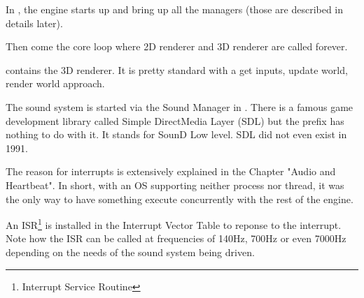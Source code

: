 \documentclass[book.tex]{subfiles}
\begin{document}
\par
In , the engine starts up and bring up all the managers (those are described in details later).\\
\par
\begin{minipage}{\textwidth}

\end{minipage}
\par
Then come the core loop where 2D renderer and 3D renderer are called forever.\\
\par
\begin{minipage}{\textwidth}

\end{minipage}
\par
{} contains the 3D renderer. It is pretty standard with a get inputs, update world, render world approach.\\
\par
\begin{minipage}{\textwidth}

\end{minipage}
\par
The sound system is started via the Sound Manager in . There is a famous game development library called Simple DirectMedia Layer (SDL) but the prefix  has nothing to do with it. It stands for SounD Low level. SDL did not even exist in 1991.\\
\par
The reason for interrupts is extensively explained in the Chapter "Audio and Heartbeat". In short, with an OS supporting neither process nor thread, it was the only way to have something execute concurrently with the rest of the engine.\\
\par
An ISR\footnote{Interrupt Service Routine} is installed in the Interrupt Vector Table to reponse to the interrupt. Note how the ISR can be called at frequencies of 140Hz, 700Hz or even 7000Hz depending on the needs of the sound system being driven.\\
\par
\begin{minipage}{\textwidth}

\end{minipage}
\par
\end{document}
